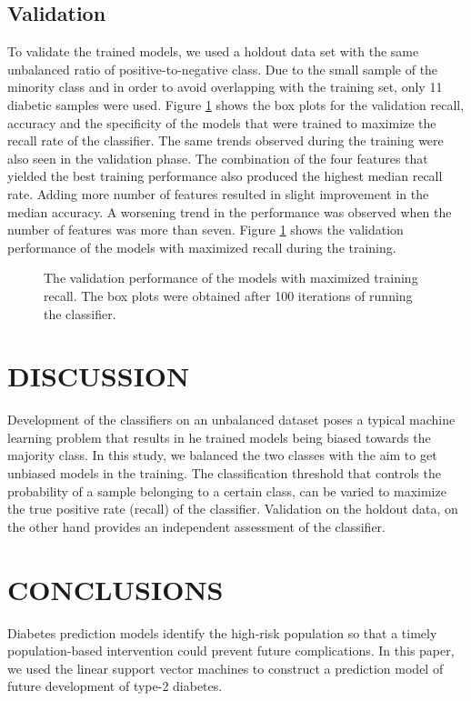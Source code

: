 \documentclass[a4paper,twoside]{article}
\begin{document}
\subsection{Validation}
%
To validate the trained models, we used a holdout data set with the same unbalanced ratio of positive-to-negative class. Due to the small sample of the minority class and in order to avoid overlapping with the training set, only \num{11} diabetic samples were used. Figure \ref{fig:perf_validation} shows the box plots for the validation recall, accuracy and the specificity of the models that were trained to maximize the recall rate of the classifier. The same trends observed during the training were also seen in the validation phase. The combination of the four features that yielded the best training performance also produced the highest median recall rate. Adding more number of features resulted in slight improvement in the median accuracy. A worsening trend in the performance was observed when the number of features was more than seven. Figure \ref{fig:perf_validation} shows the validation performance of the models with maximized recall during the training.
%
\begin{figure}[!tp]
  \centering
  \hfil
  \hfil
\caption{The validation performance of the models with maximized training recall. The box plots were obtained after 100 iterations of running the classifier.}
    \label{fig:perf_validation}
\end{figure}
%
%
\section{\uppercase{Discussion}}
\label{sec:discussion}
%
\noindent Development of the classifiers on an unbalanced dataset poses a typical machine learning problem that results in he trained models being biased towards the majority class. In this study, we balanced the two classes with the aim to get unbiased models in the training. The classification threshold that controls the probability of a sample belonging to a certain class, can be varied to maximize the true positive rate (recall) of the classifier. Validation on the holdout data, on the other hand provides an independent assessment of the classifier.
\section{\uppercase{Conclusions}}
\label{sec:conclusion}
%
\noindent Diabetes prediction models identify the high-risk population so that a timely population-based intervention could prevent future complications. In this paper, we used the linear support vector machines to construct a prediction model of future development of type-2 diabetes.
\end{document}

